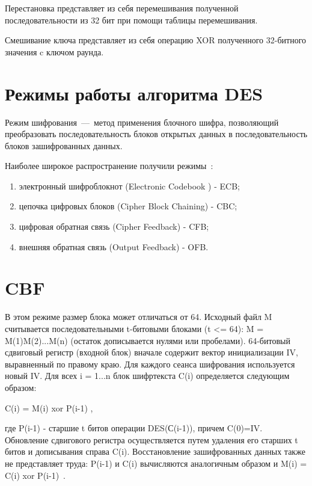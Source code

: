Перестановка представляет из себя перемешивания полученной последовательности из 32 бит при помощи таблицы перемешивания.

Смешивание ключа представляет из себя операцию XOR полученного 32-битного значения c ключом раунда.

\section{Режимы работы алгоритма DES}

Режим шифрования~---~метод применения блочного шифра, позволяющий преобразовать последовательность блоков открытых данных в последовательность блоков зашифрованных данных.

Наиболее широкое распространение получили режимы~\cite{cpp-lang}:
\begin{enumerate}[label=\arabic*)]
	\item электронный шифроблокнот (Electronic Codebook ) - ECB;
	\item цепочка цифровых блоков (Cipher Block Chaining) - CBC;
	\item цифровая обратная связь (Cipher Feedback) - CFB;
	\item внешняя обратная связь (Output Feedback) - OFB.
\end{enumerate}

\clearpage

\section{CBF}

В этом режиме размер блока может отличаться от 64.
Исходный файл M считывается последовательными t-битовыми блоками (t <= 64): M = M(1)M(2)...M(n) (остаток дописывается нулями или пробелами).
64-битовый сдвиговый регистр (входной блок) вначале содержит вектор инициализации IV, выравненный по правому краю.
Для каждого сеанса шифрования используется новый IV.
Для всех i = 1...n блок шифртекста C(i) определяется следующим образом:

C(i) = M(i) xor P(i-1) ,

где P(i-1) - старшие t битов операции DES(С(i-1)), причем C(0)=IV.
Обновление сдвигового регистра осуществляется путем удаления его старших t битов и дописывания справа C(i).
Восстановление зашифрованных данных также не представляет труда: P(i-1) и C(i) вычисляются аналогичным образом и M(i) = C(i) xor P(i-1)~\cite{cpp-lang}.
